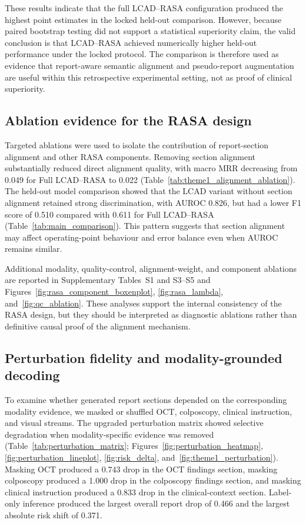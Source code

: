 These results indicate that the full LCAD--RASA configuration produced the highest point estimates in the locked held-out comparison. However, because paired bootstrap testing did not support a statistical superiority claim, the valid conclusion is that LCAD--RASA achieved numerically higher held-out performance under the locked protocol. The comparison is therefore used as evidence that report-aware semantic alignment and pseudo-report augmentation are useful within this retrospective experimental setting, not as proof of clinical superiority.

\subsection{Ablation evidence for the RASA design}
\label{subsec:ablation_results}

Targeted ablations were used to isolate the contribution of report-section alignment and other RASA components. Removing section alignment substantially reduced direct alignment quality, with macro MRR decreasing from 0.049 for Full LCAD--RASA to 0.022 (Table~\ref{tab:theme1_alignment_ablation}). The held-out model comparison showed that the LCAD variant without section alignment retained strong discrimination, with AUROC 0.826, but had a lower F1 score of 0.510 compared with 0.611 for Full LCAD--RASA (Table~\ref{tab:main_comparison}). This pattern suggests that section alignment may affect operating-point behaviour and error balance even when AUROC remains similar.

Additional modality, quality-control, alignment-weight, and component ablations are reported in Supplementary Tables~S1 and S3--S5 and Figures~\ref{fig:rasa_component_boxenplot}, \ref{fig:rasa_lambda}, and~\ref{fig:qc_ablation}. These analyses support the internal consistency of the RASA design, but they should be interpreted as diagnostic ablations rather than definitive causal proof of the alignment mechanism.

\subsection{Perturbation fidelity and modality-grounded decoding}
\label{subsec:perturbation_results}

To examine whether generated report sections depended on the corresponding modality evidence, we masked or shuffled OCT, colposcopy, clinical instruction, and visual streams. The upgraded perturbation matrix showed selective degradation when modality-specific evidence was removed (Table~\ref{tab:perturbation_matrix}; Figures~\ref{fig:perturbation_heatmap}, \ref{fig:perturbation_lineplot}, \ref{fig:risk_delta}, and~\ref{fig:theme1_perturbation}). Masking OCT produced a 0.743 drop in the OCT findings section, masking colposcopy produced a 1.000 drop in the colposcopy findings section, and masking clinical instruction produced a 0.833 drop in the clinical-context section. Label-only inference produced the largest overall report drop of 0.466 and the largest absolute risk shift of 0.371.


